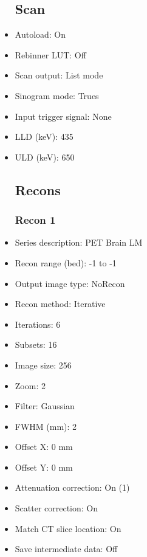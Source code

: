 \documentclass[12pt]{article}
\begin{document}
\begin{itemize}
\subsection{Scan}
\item Autoload: On
\item Rebinner LUT: Off
\item Scan output: List mode
\item Sinogram mode: Trues
\item Input trigger signal: None
\item LLD (keV): 435
\item ULD (keV): 650
\subsection{Recons}
\subsubsection{Recon 1}
\item Series description: PET Brain LM
\item Recon range (bed): -1 to -1
\item Output image type: NoRecon
\item Recon method: Iterative
\item Iterations: 6
\item Subsets: 16
\item Image size: 256
\item Zoom: 2
\item Filter: Gaussian
\item FWHM (mm): 2
\item Offset X: 0 mm
\item Offset Y: 0 mm
\item Attenuation correction: On (1)
\item Scatter correction: On
\item Match CT slice location: On
\item Save intermediate data: Off
\end{itemize}
\end{document}
